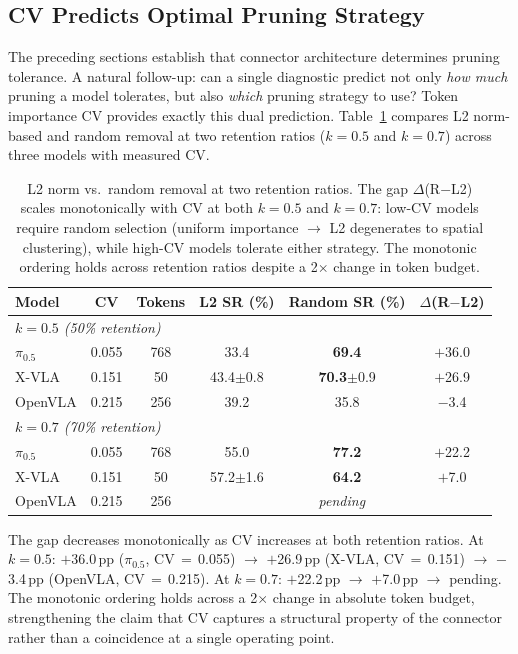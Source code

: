 \subsection{CV Predicts Optimal Pruning Strategy}
\label{sec:scaling_law}

The preceding sections establish that connector architecture determines pruning tolerance. A natural follow-up: can a single diagnostic predict not only \emph{how much} pruning a model tolerates, but also \emph{which} pruning strategy to use? Token importance CV provides exactly this dual prediction. Table~\ref{tab:scaling_law} compares L2 norm-based and random removal at two retention ratios ($k{=}0.5$ and $k{=}0.7$) across three models with measured CV.

\begin{table}[t]
\centering
\small
\caption{L2 norm vs.\ random removal at two retention ratios. The gap $\Delta$(R$-$L2) scales monotonically with CV at both $k{=}0.5$ and $k{=}0.7$: low-CV models require random selection (uniform importance $\rightarrow$ L2 degenerates to spatial clustering), while high-CV models tolerate either strategy. The monotonic ordering holds across retention ratios despite a 2$\times$ change in token budget.}
\label{tab:scaling_law}
\begin{tabular}{lccccc}
\toprule
Model & CV & Tokens & L2 SR (\%) & Random SR (\%) & $\Delta$(R$-$L2) \\
\midrule
\multicolumn{6}{l}{\textit{$k{=}0.5$ (50\% retention)}} \\
$\pi_0.5$ & 0.055 & 768 & 33.4 & \textbf{69.4} & $+$36.0 \\
X-VLA & 0.151 & 50 & 43.4$\pm$0.8 & \textbf{70.3}$\pm$0.9 & $+$26.9 \\
OpenVLA & 0.215 & 256 & 39.2 & 35.8 & $-$3.4 \\
\midrule
\multicolumn{6}{l}{\textit{$k{=}0.7$ (70\% retention)}} \\
$\pi_0.5$ & 0.055 & 768 & 55.0 & \textbf{77.2} & $+$22.2 \\
X-VLA & 0.151 & 50 & 57.2$\pm$1.6 & \textbf{64.2} & $+$7.0 \\
OpenVLA & 0.215 & 256 & \multicolumn{3}{c}{\textit{pending}} \\
\bottomrule
\end{tabular}
\end{table}

The gap decreases monotonically as CV increases at both retention ratios. At $k{=}0.5$: $+$36.0\,pp ($\pi_0.5$, CV$\,{=}\,$0.055) $\rightarrow$ $+$26.9\,pp (X-VLA, CV$\,{=}\,$0.151) $\rightarrow$ $-$3.4\,pp (OpenVLA, CV$\,{=}\,$0.215). At $k{=}0.7$: $+$22.2\,pp $\rightarrow$ $+$7.0\,pp $\rightarrow$ pending. The monotonic ordering holds across a 2$\times$ change in absolute token budget, strengthening the claim that CV captures a structural property of the connector rather than a coincidence at a single operating point.

